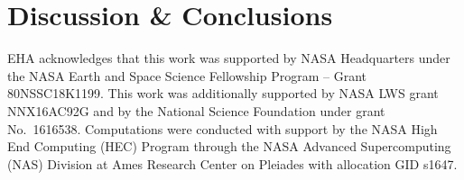 \documentclass[aps, pre, onecolumn, nofootinbib, notitlepage, groupedaddress, amsfonts, amssymb, amsmath, longbibliography]{revtex4-1}
\begin{document}
\section{Discussion \& Conclusions}
\label{sec:extensions}

\begin{acknowledgments}
EHA acknowledges that this work was supported by NASA Headquarters under the NASA Earth and Space Science Fellowship Program -- Grant 80NSSC18K1199.
This work was additionally supported by NASA LWS grant NNX16AC92G and by the National Science Foundation under grant No.~1616538. 
Computations were conducted with support by the NASA High End Computing (HEC) Program through the NASA  Advanced Supercomputing (NAS) Division at Ames Research Center on Pleiades with allocation GID s1647.
\end{acknowledgments}



\end{document}

